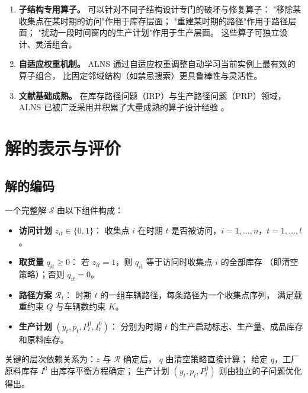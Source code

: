 \documentclass{article}
\begin{document}
\begin{enumerate}
  \item \textbf{子结构专用算子。}
    可以针对不同子结构设计专门的破坏与修复算子：
    "移除某收集点在某时期的访问"作用于库存层面；
    "重建某时期的路径"作用于路径层面；
    "扰动一段时间窗内的生产计划"作用于生产层面。
    这些算子可独立设计、灵活组合。
  \item \textbf{自适应权重机制。}
    ALNS 通过自适应权重调整自动学习当前实例上最有效的算子组合，
    比固定邻域结构（如禁忌搜索）更具鲁棒性与灵活性。
  \item \textbf{文献基础成熟。}
    在库存路径问题（IRP）与生产路径问题（PRP）领域，
    ALNS 已被广泛采用并积累了大量成熟的算子设计经验
    \cite{Ropke2006,Pisinger2007,Coelho2014,Adulyasak2015}。
\end{enumerate}

\section{解的表示与评价}
\label{sec:alns-representation}

\subsection{解的编码}

一个完整解 $\mathcal{S}$ 由以下组件构成：

\begin{itemize}
  \item \textbf{访问计划} $z_{it} \in \{0,1\}$：
    收集点 $i$ 在时期 $t$ 是否被访问，$i=1,\dots,n$，$t=1,\dots,l$。
  \item \textbf{取货量} $q_{it} \geq 0$：
    若 $z_{it}=1$，则 $q_{it}$ 等于访问时收集点 $i$ 的全部库存
    （即清空策略）；否则 $q_{it}=0$。
  \item \textbf{路径方案} $\mathcal{R}_t$：
    时期 $t$ 的一组车辆路径，每条路径为一个收集点序列，
    满足载重约束 $Q$ 与车辆数约束 $K$。
  \item \textbf{生产计划} $(y_t, p_t, P^0_t, I^0_t)$：
    分别为时期 $t$ 的生产启动标志、生产量、成品库存和原料库存。
\end{itemize}

关键的层次依赖关系为：$z$ 与 $\mathcal{R}$ 确定后，
$q$ 由清空策略直接计算；
给定 $q$，工厂原料库存 $I^0$ 由库存平衡方程确定；
生产计划 $(y_t, p_t, P^0_t)$ 则由独立的子问题优化得出。
\end{document}
